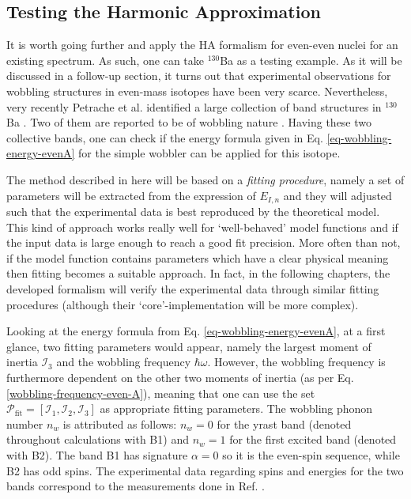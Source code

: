 \subsection{Testing the Harmonic Approximation}

It is worth going further and apply the HA formalism for even-even nuclei for an existing spectrum. As such, one can take $^{130}$Ba as a testing example. As it will be discussed in a follow-up section, it turns out that experimental observations for wobbling structures in even-mass isotopes have been very scarce. Nevertheless,  very recently Petrache et al. identified a large collection of band structures in $^{130}$Ba \cite{petrache2019diversity}. Two of them are reported to be of wobbling nature \cite{chen2019transverse}. Having these two collective bands, one can check if the energy formula given in Eq. \ref{eq-wobbling-energy-evenA} for the simple wobbler can be applied for this isotope.

The method described in here will be based on a \emph{fitting procedure}, namely a set of parameters will be extracted from the expression of $E_{I,n}$ and they will adjusted such that the experimental data is best reproduced by the theoretical model. This kind of approach works really well for `well-behaved' model functions and if the input data is large enough to reach a good fit precision. More often than not, if the model function contains parameters which have a clear physical meaning then fitting becomes a suitable approach. In fact, in the following chapters, the developed formalism will verify the experimental data through similar fitting procedures (although their `core'-implementation will be more complex).

Looking at the energy formula from Eq. \ref{eq-wobbling-energy-evenA}, at a first glance, two fitting parameters would appear, namely the largest moment of inertia $\mathcal{I}_3$ and the wobbling frequency $\hbar\omega$. However, the wobbling frequency is furthermore dependent on the other two moments of inertia (as per Eq. \ref{wobbling-frequency-even-A}), meaning that one can use the set $\mathcal{P}_\text{fit}=\left[\mathcal{I}_1,\mathcal{I}_2,\mathcal{I}_3\right]$ as appropriate fitting parameters. The wobbling phonon number $n_w$ is attributed as follows: $n_w=0$ for the yrast band (denoted throughout calculations with B1) and $n_w=1$ for the first excited band (denoted with B2). The band B1 has signature $\alpha=0$ so it is the even-spin sequence, while B2 has odd spins. The experimental data regarding spins and energies for the two bands correspond to the measurements done in Ref. \cite{petrache2019diversity}.

